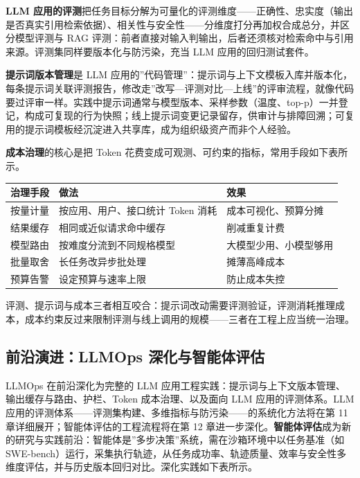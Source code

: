 \documentclass[
]{ctexbook}
\newcounter{none}
\begin{document}
\textbf{LLM
应用的评测}把任务目标分解为可量化的评测维度------正确性、忠实度（输出是否真实引用检索依据）、相关性与安全性------分维度打分再加权合成总分，并区分模型评测与
RAG
评测：前者直接对输入判输出，后者还须核对检索命中与引用来源。评测集同样要版本化与防污染，充当
LLM 应用的回归测试套件。

\textbf{提示词版本管理}是 LLM
应用的''代码管理''：提示词与上下文模板入库并版本化，每条提示词关联评测报告，修改走''改写---评测对比---上线''的评审流程，就像代码要过评审一样。实践中提示词通常与模型版本、采样参数（温度、top-p）一并登记，构成可复现的行为快照；线上提示词变更记录留存，供审计与排障回溯；可复用的提示词模板经沉淀进入共享库，成为组织级资产而非个人经验。

\textbf{成本治理}的核心是把 Token
花费变成可观测、可约束的指标，常用手段如下表所示。

{\def\LTcaptype{none} %
\begin{longtable}[]{@{}lll@{}}
\toprule\noalign{}
治理手段 & 做法 & 效果 \\
\midrule\noalign{}
\endhead
\bottomrule\noalign{}
\endlastfoot
按量计量 & 按应用、用户、接口统计 Token 消耗 & 成本可视化、预算分摊 \\
结果缓存 & 相同或近似请求命中缓存 & 削减重复计费 \\
模型路由 & 按难度分流到不同规格模型 & 大模型少用、小模型够用 \\
批量取舍 & 长任务改异步批处理 & 摊薄高峰成本 \\
预算告警 & 设定预算与速率上限 & 防止成本失控 \\
\end{longtable}
}

评测、提示词与成本三者相互咬合：提示词改动需要评测验证，评测消耗推理成本，成本约束反过来限制评测与线上调用的规模------三者在工程上应当统一治理。

\subsection{前沿演进：LLMOps
深化与智能体评估}\label{ux524dux6cbfux6f14ux8fdbllmops-ux6df1ux5316ux4e0eux667aux80fdux4f53ux8bc4ux4f30}

LLMOps 在前沿深化为完整的 LLM
应用工程实践：提示词与上下文版本管理、输出缓存与路由、护栏、Token
成本治理、以及面向 LLM 应用的评测体系。LLM
应用的评测体系------评测集构建、多维指标与防污染------的系统化方法将在第
11 章详细展开；智能体评估的工程流程将在第 12
章进一步深化。\textbf{智能体评估}成为新的研究与实践前沿：智能体是''多步决策''系统，需在沙箱环境中以任务基准（如
SWE-bench）运行，采集执行轨迹，从任务成功率、轨迹质量、效率与安全性多维度评估，并与历史版本回归对比。深化实践如下表所示。
\end{document}

